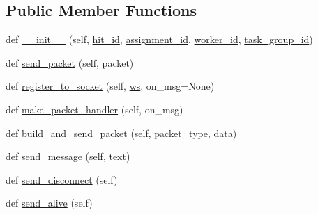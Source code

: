 \subsection*{Public Member Functions}
\begin{DoxyCompactItemize}
\item 
def \hyperlink{classparlai_1_1mturk_1_1core_1_1dev_1_1test_1_1test__full__system_1_1MockAgent_ae2c5906fb77600feb2d4c8d1ede4e415}{\+\_\+\+\_\+init\+\_\+\+\_\+} (self, \hyperlink{classparlai_1_1mturk_1_1core_1_1dev_1_1test_1_1test__full__system_1_1MockAgent_a14ab479e747cb0b419dc3b124a739a20}{hit\+\_\+id}, \hyperlink{classparlai_1_1mturk_1_1core_1_1dev_1_1test_1_1test__full__system_1_1MockAgent_a8e18de4b588ad5b7282066619625575e}{assignment\+\_\+id}, \hyperlink{classparlai_1_1mturk_1_1core_1_1dev_1_1test_1_1test__full__system_1_1MockAgent_ac650da6ff87504608c878970c285300d}{worker\+\_\+id}, \hyperlink{classparlai_1_1mturk_1_1core_1_1dev_1_1test_1_1test__full__system_1_1MockAgent_af5c178fe0532006e0caa33d4af417a58}{task\+\_\+group\+\_\+id})
\item 
def \hyperlink{classparlai_1_1mturk_1_1core_1_1dev_1_1test_1_1test__full__system_1_1MockAgent_a439c09f491611c9d91aea875f44ac435}{send\+\_\+packet} (self, packet)
\item 
def \hyperlink{classparlai_1_1mturk_1_1core_1_1dev_1_1test_1_1test__full__system_1_1MockAgent_a97d5a5cb8bf72c4a294e51e0cf275911}{register\+\_\+to\+\_\+socket} (self, \hyperlink{classparlai_1_1mturk_1_1core_1_1dev_1_1test_1_1test__full__system_1_1MockAgent_a3f78abd8b89afc52fae4a46424c18753}{ws}, on\+\_\+msg=None)
\item 
def \hyperlink{classparlai_1_1mturk_1_1core_1_1dev_1_1test_1_1test__full__system_1_1MockAgent_a9fb654ef5b3775a6991dc1dcafa16835}{make\+\_\+packet\+\_\+handler} (self, on\+\_\+msg)
\item 
def \hyperlink{classparlai_1_1mturk_1_1core_1_1dev_1_1test_1_1test__full__system_1_1MockAgent_a62cda90db92b3c458a48661f3a37be28}{build\+\_\+and\+\_\+send\+\_\+packet} (self, packet\+\_\+type, data)
\item 
def \hyperlink{classparlai_1_1mturk_1_1core_1_1dev_1_1test_1_1test__full__system_1_1MockAgent_ad083e4d20ea195735ab6694723a65ebd}{send\+\_\+message} (self, text)
\item 
def \hyperlink{classparlai_1_1mturk_1_1core_1_1dev_1_1test_1_1test__full__system_1_1MockAgent_a0ae8ffc34c8a563239335eac90dfa9ac}{send\+\_\+disconnect} (self)
\item 
def \hyperlink{classparlai_1_1mturk_1_1core_1_1dev_1_1test_1_1test__full__system_1_1MockAgent_a2a8aaa90f95349b4de8517bfd6d010d6}{send\+\_\+alive} (self)
\end{DoxyCompactItemize}
